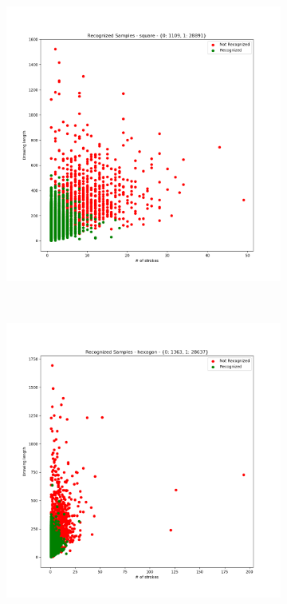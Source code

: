 \begin{figure}
\begin{subfigure}{0.3\textwidth}
    \end{subfigure}
    ~
    \begin{subfigure}{0.3\textwidth}
        \includegraphics[scale=0.28]{images/dataset/recog_square.png}
    \end{subfigure}
    ~
    \begin{subfigure}{0.3\textwidth}
        \includegraphics[scale=0.28]{images/dataset/recog_hexagon.png}

\end{subfigure}
\end{figure}
